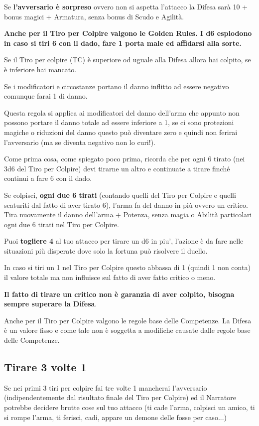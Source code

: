 \documentclass[a4paper,11pt,twoside,openany]{book}
\begin{document}
Se \textbf{l'avversario è sorpreso} ovvero non si aspetta l'attacco la Difesa sarà 10 + bonus magici + Armatura, senza bonus di Scudo e Agilità.

\textbf{Anche per il Tiro per Colpire valgono le Golden Rules. I d6 esplodono in caso si tiri 6 con il dado, fare 1 porta male ed affidarsi alla sorte.}

Se il Tiro per colpire (TC) è superiore od uguale alla Difesa allora hai colpito, se è inferiore hai mancato.

Se i modificatori e circostanze portano il danno inflitto ad essere negativo comunque farai 1 di danno.

Questa regola si applica ai modificatori del danno dell'arma che appunto non possono portare il danno totale ad essere inferiore a 1, se ci sono protezioni magiche o riduzioni del danno questo può diventare zero e quindi non ferirai l'avversario (ma se diventa negativo non lo curi!).

Come prima cosa, come spiegato poco prima, ricorda che per ogni 6 tirato (nei 3d6 del Tiro per Colpire) devi tirarne un altro e continuate a tirare finché continui a fare 6 con il dado.

Se colpisci, \textbf{ogni due 6 tirati} (contando quelli del Tiro per Colpire e quelli scaturiti dal fatto di aver tirato 6), l'arma fa del danno in più ovvero un critico. Tira nuovamente il danno dell'arma + Potenza, senza magia o Abilità particolari ogni due 6 tirati nel Tiro per Colpire.

Puoi \textbf{togliere 4} al tuo attacco per tirare un d6 in piu', l'azione è da fare nelle situazioni più disperate dove solo la fortuna può risolvere il duello.

In caso si tiri un 1 nel Tiro per Colpire questo abbassa di 1 (quindi 1 non conta) il valore totale ma non influisce sul fatto di aver fatto critico o meno.

\textbf{Il fatto di tirare un critico non è garanzia di aver colpito,
bisogna sempre superare la Difesa}.

Anche per il Tiro per Colpire valgono le regole base delle Competenze.
La Difesa è un valore fisso e come tale non è soggetta a modifiche
causate dalle regole base delle Competenze.

\subsection{Tirare 3 volte 1}

Se nei primi 3 tiri per colpire fai tre volte 1 mancherai l'avversario (indipendentemente dal risultato finale del Tiro per Colpire) ed il Narratore potrebbe decidere brutte cose sul tuo attacco (ti cade l'arma, colpisci un amico, ti si rompe l'arma, ti ferisci, cadi, appare un demone delle fosse per caso...)
\end{document}
